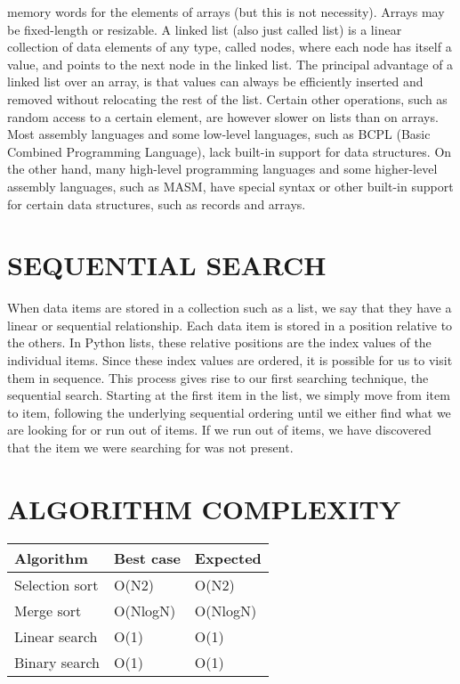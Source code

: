 \documentclass{article}
\begin{document}
memory words for the elements of arrays (but this is 
not necessity). Arrays may be fixed-length or 
resizable. A linked list (also just called list) is a linear 
collection of data elements of any type, called nodes, 
where each node has itself a value, and points to the 
next node in the linked list. The principal advantage 
of a linked list over an array, is that values can always 
be efficiently inserted and removed without relocating 
the rest of the list. Certain other operations, such as 
random access to a certain element, are however 
slower on lists than on arrays. Most assembly languages and some low-level languages, such as BCPL (Basic Combined Programming Language), 
lack built-in support for data structures. On the other 
hand, many high-level programming languages and 
some higher-level assembly languages, such as 
MASM, have special syntax or other built-in support 
for certain data structures, such as records and arrays.

\section{SEQUENTIAL SEARCH}
When data items are stored in a collection such as a 
list, we say that they have a linear or sequential 
relationship. Each data item is stored in a position 
relative to the others. In Python lists, these relative 
positions are the index values of the individual items. 
Since these index values are ordered, it is possible for 
us to visit them in sequence. This process gives rise to 
our first searching technique, the sequential search. 
Starting at the first item in the list, we simply move 
from item to item, following the underlying sequential 
ordering until we either find what we are looking for 
or run out of items. If we run out of items, we have 
discovered that the item we were searching for was 
not present.



\begin{table}
\section*{ALGORITHM COMPLEXITY}
\begin{center}
    
    \centering
    \begin{tabular}{ | m{10em} | m{10em}| m{10em} | } 
    \hline
         Algorithm & Best case & Expected \\
         \hline
         Selection sort & O(N2) & O(N2)\\
         \hline
         Merge sort & O(NlogN) & O(NlogN)\\
         \hline
         Linear search & O(1) & O(1)\\
         \hline
         Binary search & O(1) & O(1)\\
         \hline
         
         
    \end{tabular}
  
    \label{tab:my_label}
    \end{center}
\end{table}
\end{document}
